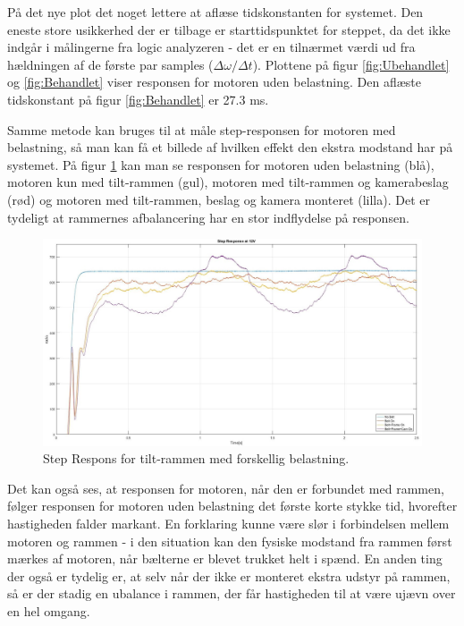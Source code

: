 På det nye plot det noget lettere at aflæse tidskonstanten for systemet. Den eneste store usikkerhed der er tilbage er starttidspunktet for steppet, da det ikke indgår i målingerne fra logic analyzeren - det er en tilnærmet værdi ud fra hældningen af de første par samples ($\Delta\omega/\Delta t$). Plottene på figur \ref{fig:Ubehandlet} og \ref{fig:Behandlet} viser responsen for motoren uden belastning. Den aflæste tidskonstant på figur \ref{fig:Behandlet} er 27.3 ms.

Samme metode kan bruges til at måle step-responsen for motoren med belastning, så man kan få et billede af hvilken effekt den ekstra modstand har på systemet. På figur \ref{fig:Combined} kan man se responsen for motoren uden belastning (blå), motoren kun med tilt-rammen (gul), motoren med tilt-rammen og kamerabeslag (rød) og motoren med tilt-rammen, beslag og kamera monteret (lilla). Det er tydeligt at rammernes afbalancering har en stor indflydelse på responsen.

\begin{figure}[!ht]
	\begin{center}
		\includegraphics[scale=0.35]{Billeder/Response_Combined.jpg}
	\end{center}
	\caption{Step Respons for tilt-rammen med forskellig belastning.}
	\label{fig:Combined}
\end{figure}

Det kan også ses, at responsen for motoren, når den er forbundet med rammen, følger responsen for motoren uden belastning det første korte stykke tid, hvorefter hastigheden falder markant. En forklaring kunne være slør i forbindelsen mellem motoren og rammen - i den situation kan den fysiske modstand fra rammen først mærkes af motoren, når bælterne er blevet trukket helt i spænd. En anden ting der også er tydelig er, at selv når der ikke er monteret ekstra udstyr på rammen, så er der stadig en ubalance i rammen, der får hastigheden til at være ujævn over en hel omgang.

